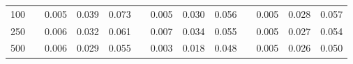 % 
\begin{tabular}{ccccccccccccc}
  \hline
  \hline
100 &  & 0.005 & 0.039 & 0.073 &  & 0.005 & 0.030 & 0.056 &  & 0.005 & 0.028 & 0.057 \\ 
  250 &  & 0.006 & 0.032 & 0.061 &  & 0.007 & 0.034 & 0.055 &  & 0.005 & 0.027 & 0.054 \\ 
  500 &  & 0.006 & 0.029 & 0.055 &  & 0.003 & 0.018 & 0.048 &  & 0.005 & 0.026 & 0.050 \\ 
   \hline
\end{tabular}
